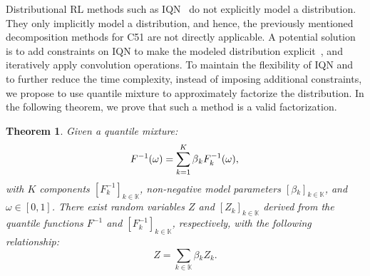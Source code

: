 \documentclass[twoside,11pt]{article}
\newcommand{\agentspace}{\mathbb{K}}
\newcommand{\agentcounter}{k}
\newcommand{\numberofagents}{K}
\newcommand{\utility}{Z}
\newcommand{\quantilefunction}{F^{-1}}
\newcommand{\quantile}{\omega}
\newcommand{\modelparameter}{\beta}
\newcounter{theorem0}
\newtheorem{theorem}[theorem0]{Theorem}
\begin{document}
Distributional RL methods such as IQN~\citep{Dabney2018IQN} do not explicitly model a distribution. They only implicitly model a distribution, and hence, the previously mentioned decomposition methods for C51 are not directly applicable. A potential solution is to add constraints on IQN to make the modeled distribution explicit~\citep{Yang2019FQF}, and iteratively apply convolution operations. To maintain the flexibility of IQN and to further reduce the time complexity, instead of imposing additional constraints, we propose to use quantile mixture to approximately factorize the distribution. In the following theorem, we prove that such a method is a valid factorization.
\begin{theorem}
\label{thm:sum_of_rv}
Given a quantile mixture:
\begin{equation}
\quantilefunction(\quantile{})=\sum^{\numberofagents{}}_{k=1}\modelparameter{}_{\agentcounter{}} \quantilefunction_{\agentcounter{}}(\quantile{}),
\notag{}
\end{equation}
with $\numberofagents{}$ components $[\quantilefunction_{\agentcounter{}}]_{\agentcounter{}\in\agentspace{}}$, non-negative model parameters $[\modelparameter{}_{\agentcounter{}}]_{\agentcounter{}\in\agentspace{}}$, and $\quantile\in[0,1]$. There exist random variables $\utility{}$ and $[\utility_{\agentcounter{}}]_{\agentcounter{}\in\agentspace{}}$ derived from the quantile functions $\quantilefunction$ and $[\quantilefunction_{\agentcounter{}}]_{\agentcounter{}\in\agentspace{}}$, respectively, with the following relationship:
\begin{equation*}
\utility{}=\sum_{\agentcounter\in\agentspace{}}\modelparameter{}_{\agentcounter{}} \utility{}_{\agentcounter{}}.
\end{equation*}

\end{theorem}
\end{document}
